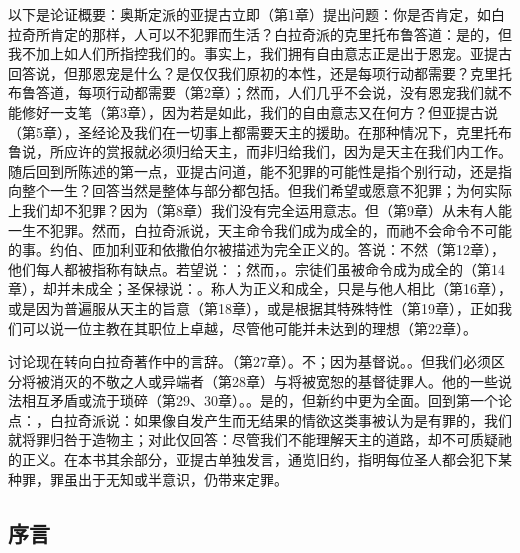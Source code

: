 以下是论证概要：奥斯定派的亚提古立即（第1章）提出问题：你是否肯定，如白拉奇所肯定的那样，人可以不犯罪而生活？白拉奇派的克里托布鲁答道：是的，但我不加上如人们所指控我们的。事实上，我们拥有自由意志正是出于恩宠。亚提古回答说，但那恩宠是什么？是仅仅我们原初的本性，还是每项行动都需要？克里托布鲁答道，每项行动都需要（第2章）；然而，人们几乎不会说，没有恩宠我们就不能修好一支笔（第3章），因为若是如此，我们的自由意志又在何方？但亚提古说（第5章），圣经论及我们在一切事上都需要天主的援助。在那种情况下，克里托布鲁说，所应许的赏报就必须归给天主，而非归给我们，因为是天主在我们内工作。随后回到所陈述的第一点，亚提古问道，能不犯罪的可能性是指个别行动，还是指向整个一生？回答当然是整体与部分都包括。但我们希望或愿意不犯罪；为何实际上我们却不犯罪？因为（第8章）我们没有完全运用意志。但（第9章）从未有人能一生不犯罪。然而，白拉奇派说，天主命令我们成为成全的，而祂不会命令不可能的事。约伯、匝加利亚和依撒伯尔被描述为完全正义的。答说：不然（第12章），他们每人都被指称有缺点。若望说：；然而，。宗徒们虽被命令成为成全的（第14章），却并未成全；圣保禄说：。称人为正义和成全，只是与他人相比（第16章），或是因为普遍服从天主的旨意（第18章），或是根据其特殊特性（第19章），正如我们可以说一位主教在其职位上卓越，尽管他可能并未达到的理想（第22章）。\par

讨论现在转向白拉奇著作中的言辞。（第27章）。不；因为基督说。。但我们必须区分将被消灭的不敬之人或异端者（第28章）与将被宽恕的基督徒罪人。他的一些说法相互矛盾或流于琐碎（第29、30章）。。是的，但新约中更为全面。回到第一个论点：，白拉奇派说：如果像自发产生而无结果的情欲这类事被认为是有罪的，我们就将罪归咎于造物主；对此仅回答：尽管我们不能理解天主的道路，却不可质疑祂的正义。在本书其余部分，亚提古单独发言，通览旧约，指明每位圣人都会犯下某种罪，罪虽出于无知或半意识，仍带来定罪。\par


\subsection{序言}

